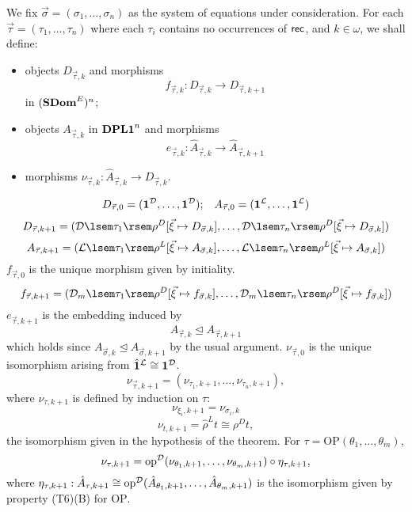 We fix $\vec{\sigma} = (\sigma_{1}, \ldots , \sigma_{n})$ as the system of equations under consideration. For each $\vec{\tau} = (\tau_{1}, \ldots , \tau_{n})$ where each $\tau_{i}$ contains no occurrences of ${\sf rec}$, and $k \in \omega$, we shall define:
\begin{itemize}
\item objects $D_{\vec{\tau}, k}$ and morphisms 
\[ f_{\vec{\tau}, k} : D_{\vec{\tau}, k} \rightarrow D_{\vec{\tau}, k+1} \]
in $({\bf SDom}^{E})^{n}$;
\item objects $A_{\vec{\tau}, k}$ in ${\bf DPL1}^{n}$ and morphisms
\[ e_{\vec{\tau}, k} : \hat{A}_{\vec{\tau}, k} \rightarrow \hat{A}_{\vec{\tau}, k+1} \]
\item morphisms $\nu_{\vec{\tau}, k} : \hat{A}_{\vec{\tau}, k} \rightarrow D_{\vec{\tau}, k}$.
\end{itemize}
\[ D_{\vec{\tau}, 0} = ({\bf 1}^{\cal D}, \ldots , {\bf 1}^{\cal D}); \;\;\;  A_{\vec{\tau}, 0} = ({\bf 1}^{\cal L}, \ldots , {\bf 1}^{\cal L}) \]
\[ D_{\vec{\tau}, k+1} = ({\cal D} \lsem \tau_{1} \rsem \rho^{D} [\vec{\xi} \mapsto D_{\vec{\sigma}, k}], \ldots , {\cal D} \lsem \tau_{n} \rsem \rho^{D} [\vec{\xi} \mapsto D_{\vec{\sigma}, k}]) \]
\[ A_{\vec{\tau}, k+1} = ({\cal L} \lsem \tau_{1} \rsem \rho^{L} [\vec{\xi} \mapsto A_{\vec{\sigma}, k}], \ldots , {\cal L} \lsem \tau_{n} \rsem \rho^{L} [\vec{\xi} \mapsto A_{\vec{\sigma}, k}]) \] 
$f_{\vec{\tau}, 0}$ is the unique morphism given by initiality.
\[ f_{\vec{\tau}, k+1} = ({\cal D}_{m} \lsem \tau_{1} \rsem \rho^{D} [\vec{\xi} \mapsto f_{\vec{\sigma}, k}], \ldots , {\cal D}_{m} \lsem \tau_{n} \rsem \rho^{D} [\vec{\xi} \mapsto f_{\vec{\sigma}, k}]) \]
$e_{\vec{\tau}, k+1}$ is the embedding induced by
\[ A_{\vec{\tau}, k} \trianglelefteq A_{\vec{\tau}, k+1} \]
which holds since $A_{\vec{\sigma}, k} \trianglelefteq A_{\vec{\sigma}, k+1}$ by the usual argument.
$\nu_{\vec{\tau}, 0}$ is the unique isomorphism arising from $\hat{{\bf 1}}^{\cal L} \cong {\bf 1}^{\cal D}$.
\[ \nu_{\vec{\tau}, k+1} = (\nu_{\tau_{1}, k+1}, \ldots , \nu_{\tau_{n}, k+1}), \]
where $\nu_{\tau , k+1}$ is defined by induction on $\tau$:
\[ \nu_{\xi_{i}, k+1} = \nu_{\sigma_{i}, k} \]
\[ \nu_{t, k+1} = {\hat{\rho}}^{L} t \cong {\rho}^{D} t, \]
the isomorphism given in the hypothesis of the theorem.
For $\tau = \mbox{OP}(\theta_{1}, \ldots , \theta_{m})$,
\[ \nu_{\tau , k+1} = \mbox{op}^{\cal D}(\nu_{\theta_{1}, k+1}, \ldots , 
\nu_{\theta_{m}, k+1}) \circ \eta_{\tau , k+1}, \]
where $\eta_{\tau , k+1} : \hat{A}_{\tau , k+1} \cong \mbox{op}^{\cal D}(\hat{A}_{\theta_{1}, k+1}, \ldots , \hat{A}_{\theta_{m}, k+1})$ is the isomorphism given by property (T6)(B) for $\mbox{OP}$.

